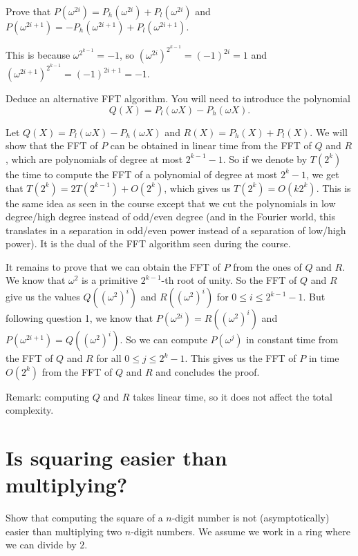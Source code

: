 \documentclass[11pt]{exam}
\theoremstyle{definition}
\begin{document}
\begin{questions}

\question Prove that $P(\omega^{2i}) = P_h(\omega^{2i}) + P_l(\omega^{2i})$
and $P(\omega^{2i+1}) = - P_h(\omega^{2i+1}) + P_l(\omega^{2i+1})$.

\begin{solution}
This is because $\omega^{2^{k-1}} = -1$, so $(\omega^{2i})^{2^{k-1}} = (-1)^{2i} = 1$ and $(\omega^{2i+1})^{2^{k-1}} = (-1)^{2i+1} = -1$.
\end{solution}

\question Deduce an alternative FFT algorithm. You will need to introduce the
polynomial \[
Q(X) = P_l(\omega X) - P_h(\omega X).
\]

\begin{solution}
Let $Q(X) = P_l(\omega X) - P_h(\omega X)$ and $R(X) = P_h(X) + P_l(X)$. We will show that the FFT of $P$ can be obtained in linear time from the FFT of $Q$ and $R$, which are polynomials of degree at most $2^{k-1}-1$. So if we denote by $T(2^k)$ the time to compute the FFT of a polynomial of degree at most $2^k-1$, we get that $T(2^k) = 2 T(2^{k-1}) + O(2^k)$, which gives us $T(2^k) = O(k2^k)$. This is the same idea as seen in the course except that we cut the polynomials in low degree/high degree instead of odd/even degree (and in the Fourier world, this translates in a separation in odd/even power instead of a separation of low/high power). It is the dual of the FFT algorithm seen during the course.

It remains to prove that we can obtain the FFT of $P$ from the ones of $Q$ and $R$. We know that $\omega^2$ is a primitive $2^{k-1}$-th root of unity. So the FFT of $Q$ and $R$ give us the values $Q((\omega^2)^i)$ and $R((\omega^2)^i)$ for $0 \leq i \leq 2^{k-1}-1$. But following question 1, we know that $P(\omega^{2i}) = R((\omega^2)^i)$ and $P(\omega^{2i+1}) = Q((\omega^2)^i)$.
So we can compute $P(\omega^j)$ in constant time from the FFT of $Q$ and $R$ for all $0 \leq j \leq 2^k-1$. This gives us the FFT of $P$ in time $O(2^k)$ from the FFT of $Q$ and $R$ and concludes the proof.

Remark: computing $Q$ and $R$ takes linear time, so it does not affect the total complexity.
\end{solution}
\end{questions}

\section{Is squaring easier than multiplying?}
Show that computing the square of a $n$-digit number is not (asymptotically) easier than multiplying two $n$-digit numbers. We assume we work in a ring where we can divide by $2$.
\end{document}
